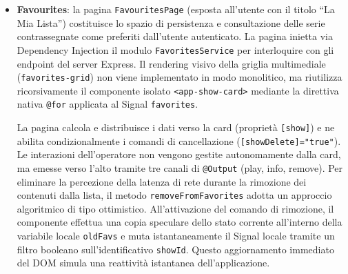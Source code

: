 \documentclass[11pt,a4paper]{article}
\begin{document}
\begin{itemize}
\begin{itemize}
    \end{itemize}
    La pagina implementa un motore di navigazione predittivo per la riproduzione continua. Infatti, all'emissione dell'evento di terminazione del video, il metodo \texttt{handleNextEpisode()} analizza la collezione ordinata del Signal \texttt{seasonEpisodes}. Qualora non si riscontri un episodio successivo all'interno della medesima stagione, interviene la routine \texttt{checkAndNavigateToNextSeason()}, la quale interroga asincronamente la gerarchia parentale della serie: se mappata, estrae la stagione successiva, effettua il fetch del rispettivo primo episodio e forza il reindirizzamento della rotta sul client, gestendo la transizione visiva mediante notifiche asincrone fornite dal \texttt{ToastController}.
    
    La pagina inoltre funge da mediatore tra il riproduttore multimediale e la sezione commenti. All'attivarsi dell'evento \texttt{timestampClick} generato dal sottocomponente \texttt{<app-comments>}, la pagina intercetta i secondi corrispondenti e pilota via hardware il lettore video (\texttt{this.videoPlayerComponent.seekTo(seconds)}), riposizionando poi fluidamente lo scroll dello schermo verso l'alto tramite le API native di \texttt{IonContent};
    \item \textbf{Favourites}: la pagina \texttt{FavouritesPage} (esposta all'utente con il titolo ``La Mia Lista'') costituisce lo spazio di persistenza e consultazione delle serie contrassegnate come preferiti dall'utente autenticato. La pagina inietta via Dependency Injection il modulo \texttt{FavoritesService} per interloquire con gli endpoint del server Express. Il rendering visivo della griglia multimediale (\texttt{favorites-grid}) non viene implementato in modo monolitico, ma riutilizza ricorsivamente il componente isolato \texttt{<app-show-card>} mediante la direttiva nativa \texttt{@for} applicata al Signal \texttt{favorites}.
    
    La pagina calcola e distribuisce i dati verso la card (proprietà \texttt{[show]}) e ne abilita condizionalmente i comandi di cancellazione (\texttt{[showDelete]="true"}). Le interazioni dell'operatore non vengono gestite autonomamente dalla card, ma emesse verso l’alto tramite tre canali di \texttt{@Output} (play, info, remove). Per eliminare la percezione della latenza di rete durante la rimozione dei contenuti dalla lista, il metodo \texttt{removeFromFavorites} adotta un approccio algoritmico di tipo ottimistico. All'attivazione del comando di rimozione, il componente effettua una copia speculare dello stato corrente all'interno della variabile locale \texttt{oldFavs} e muta istantaneamente il Signal locale tramite un filtro booleano sull'identificativo \texttt{showId}. Questo aggiornamento immediato del DOM simula una reattività istantanea dell'applicazione.
    

\end{itemize}
\end{document}
